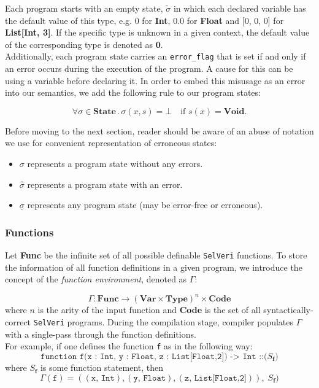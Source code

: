\documentclass{article}
\begin{document}
Each program starts with an empty state, $\tilde{\sigma}$ in which each declared variable has the default value of this type, e.g. 0 for \textbf{Int}, 0.0 for \textbf{Float} and  [0, 0, 0] for \textbf{List[Int, 3]}. If the specific type is unknown in a given context, the default value of the corresponding type is denoted as \textbf{0}.\\

Additionally, each program state carries an \texttt{error\_flag} that is set if and only if an error occurs during the execution of the program. A cause for this can be using a variable before declaring it. In order to embed this misusage as an error into our semantics, we add the following rule to our program states:

\[
\forall \sigma \in \textbf{State} \, . \, \sigma(x,s) = \bot \quad \text{if } s(x) = \textbf{Void}.
\]

Before moving to the next section, reader should be aware of an abuse of notation we use for convenient representation of erroneous states:

\begin{itemize}
    \item $\sigma$ represents a program state without any errors.
    \item $\hat{\sigma}$ represents a program state with an error.
    \item $\underline{\sigma}$ represents any program state (may be error-free or erroneous).
\end{itemize}

\subsubsection{Functions}

Let \textbf{Func} be the infinite set of all possible definable \texttt{SelVeri} functions. To store the information of all function definitions in a given program, we introduce the concept of the \textit{function environment}, denoted as $\Gamma$:

\[
\Gamma : \textbf{Func} \rightarrow (\textbf{Var} \times \textbf{Type})^n \times \textbf{Code}
\] where $n$ is the arity of the input function and \textbf{Code} is the set of all syntactically-correct \texttt{SelVeri} programs. During the compilation stage, compiler populates $\Gamma$ with a single-pass through the function definitions. \\

For example, if one defines the function \texttt{f} as in the following way:
\[
\texttt{function f(x : Int, y : Float, z : List[Float,2]) -> Int ::($S_\textbf{f}$)} 
\]
where $S_\textbf{f}$ is some function statement, then 
\[
\Gamma(\texttt{f}) = ((\texttt{x},\, \texttt{Int}), (\texttt{y},\, \texttt{Float}),(\texttt{z},\, \texttt{List[Float,2]})),\; S_\textbf{f})
\]
\end{document}
